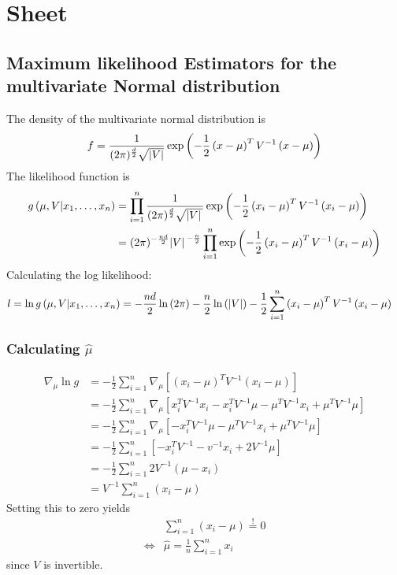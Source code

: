 \section{Sheet}
\subsection{Maximum likelihood Estimators for the multivariate Normal distribution}
The density of the multivariate normal distribution is
\begin{equation}
    f=\frac{1}{(2\pi)^{\frac{d}{2}}\sqrt{\abs{V}}}
    \exp\left(-\frac{1}{2}\left(x-\mu\right)^TV^{-1}\left(x-\mu\right)\right)
\end{equation}
The likelihood function is
\begin{align}
    g\left(\mu, V\vert x_1,\dots,x_n\right)
    &=\prod_{i=1}^{n}\frac{1}{(2\pi)^{\frac{d}{2}}\sqrt{\abs*{V}}}
    \exp\left(-\frac{1}{2}\left(x_i-\mu\right)^TV^{-1}\left(x_i-\mu\right)\right)
    \\&=(2\pi)^{-\frac{nd}{2}}\abs*{V}^{-\frac{n}{2}}
    \prod_{i=1}^{n}\exp\left(-\frac{1}{2}\left(x_i-\mu\right)^TV^{-1}\left(x_i-\mu\right)\right)
\end{align}
Calculating the log likelihood:
\begin{align}
    l = \ln g\left(\mu, V\vert x_1,\dots,x_n\right)
    &=-\frac{nd}{2}\ln\left(2\pi\right)-\frac{n}{2}\ln\left(\abs{V}\right)
    -\frac{1}{2}\sum_{i=1}^{n}\left(x_i-\mu\right)^TV^{-1}\left(x_i-\mu\right)
\end{align}
\subsubsection{Calculating $\hat{\mu}$}
\begin{align}
    \nabla_\mu \ln g &= -\frac{1}{2}\sum_{i=1}^{n}\nabla_\mu\left[\left(x_i-\mu\right)^TV^{-1}\left(x_i-\mu\right)\right]
    \\&=-\frac{1}{2}\sum_{i=1}^{n}\nabla_\mu\left[x_i^TV^{-1}x_i-x_i^TV^{-1}\mu-\mu^TV^{-1}x_i+\mu^TV^{-1}\mu\right]
    \\&=-\frac{1}{2}\sum_{i=1}^{n}\nabla_\mu\left[-x_i^TV^{-1}\mu-\mu^TV^{-1}x_i+\mu^TV^{-1}\mu\right]
    \\&=-\frac{1}{2}\sum_{i=1}^{n}\left[-x_i^TV^{-1}-v^{-1}x_i+2V^{-1}\mu\right]
    \\&=-\frac{1}{2}\sum_{i=1}^{n}2V^{-1}\left(\mu-x_i\right)
    \\&=V^{-1}\sum_{i=1}^{n}\left(x_i-\mu\right)
\end{align}
Setting this to zero yields
\begin{align}
    &\sum_{i=1}^{n}\left(x_i-\mu\right)\overset{!}{=}0
    \\\Leftrightarrow&\hat{\mu}=\frac{1}{n}\sum_{i=1}^{n}x_i
\end{align}
since $V$ is invertible.
